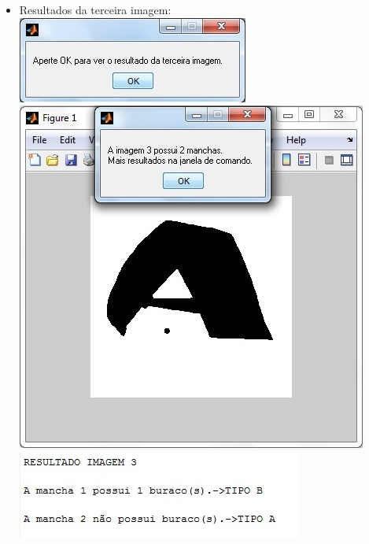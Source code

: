 \documentclass[conference]{IEEEtran}
\begin{document}
\begin{itemize}
	\item Resultados da terceira imagem:
		\vspace{2\baselineskip}\vspace{-\parskip}
		\includegraphics[scale=0.95]{images/janela3}
		\vspace{2\baselineskip}\vspace{-\parskip}
		\includegraphics[scale=0.65]{images/janela3-2}
		\includegraphics[scale=0.8]{images/comando3}
		\vspace{2\baselineskip}\vspace{-\parskip}
	

\end{itemize}
\end{document}
